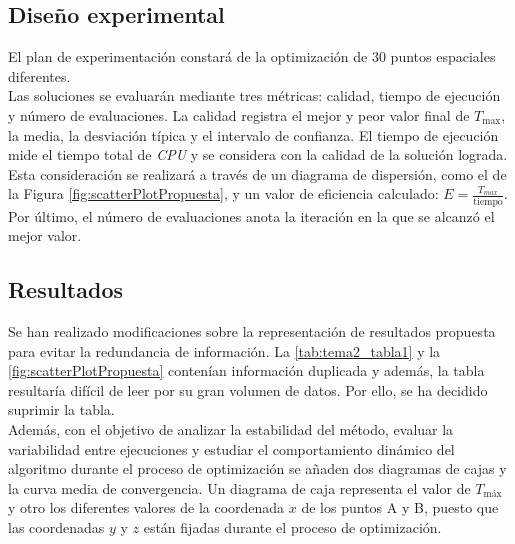 \subsection*{Diseño experimental}
El plan de experimentación constará de la optimización de 
30 puntos espaciales diferentes. \\

Las soluciones se evaluarán mediante tres métricas: calidad, tiempo de ejecución y número de evaluaciones.
La calidad registra el mejor y peor 
valor final de $T_{\max}$, la media, la desviación típica y el intervalo de confianza. El tiempo
de ejecución mide el tiempo total de \textit{CPU} y se considera con la calidad de la
solución lograda. Esta consideración se realizará a través de un diagrama de dispersión, como 
el de la Figura \ref{fig:scatterPlotPropuesta}, y 
un valor de eficiencia calculado: $E = \frac{T_{max}}{\text{tiempo}}$. Por último,
el número de evaluaciones anota la iteración en la que se alcanzó el mejor valor. \\

\subsection*{Resultados}
Se han realizado modificaciones sobre la representación de resultados propuesta para evitar 
la redundancia de información. La \autoref{tab:tema2_tabla1} y la \autoref{fig:scatterPlotPropuesta}
contenían información duplicada y además, la tabla resultaría difícil de leer por su gran volumen 
de datos. Por ello, se ha decidido suprimir la tabla. \\

Además, con el objetivo de analizar la estabilidad del método, evaluar la variabilidad entre
ejecuciones y estudiar el comportamiento dinámico del algoritmo durante el proceso de optimización
se añaden dos diagramas de cajas y la curva media de convergencia. Un diagrama de caja representa
el valor de $T_{\text{máx}}$ y otro los diferentes 
valores de la coordenada $x$ de los puntos A y B, puesto que las coordenadas $y$ y $z$ están fijadas
durante el proceso de optimización. \\

